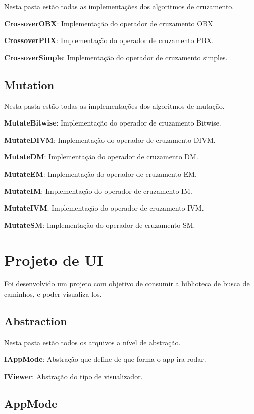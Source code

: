  Nesta pasta estão todas as implementações dos algoritmos de cruzamento.
 
 \textbf{CrossoverOBX}: Implementação do operador de cruzamento OBX.
 
 \textbf{CrossoverPBX}: Implementação do operador de cruzamento PBX.
 
 \textbf{CrossoverSimple}:  Implementação do operador de cruzamento simples.
 
 \subsection{Mutation}
 
 Nesta pasta estão todas as implementações dos algoritmos de mutação.
 
 \textbf{MutateBitwise}: Implementação do operador de cruzamento Bitwise.
 
 \textbf{MutateDIVM}: Implementação do operador de cruzamento DIVM.
 
 \textbf{MutateDM}: Implementação do operador de cruzamento DM.
 
 \textbf{MutateEM}: Implementação do operador de cruzamento EM.
 
 \textbf{MutateIM}: Implementação do operador de cruzamento IM.
 
 \textbf{MutateIVM}: Implementação do operador de cruzamento IVM.
 
 \textbf{MutateSM}: Implementação do operador de cruzamento SM.
 
 
 \section{Projeto de UI}
 
 Foi desenvolvido um projeto com objetivo de consumir a biblioteca de busca de caminhos, e poder visualiza-los.
 
 \subsection{Abstraction}
 
 Nesta pasta estão todos os arquivos a nível de abstração.
 
 \textbf{IAppMode}: Abstração que define de que forma o app ira rodar.
 
 \textbf{IViewer}: Abstração do tipo de visualizador.
 
 \subsection{AppMode}
 
